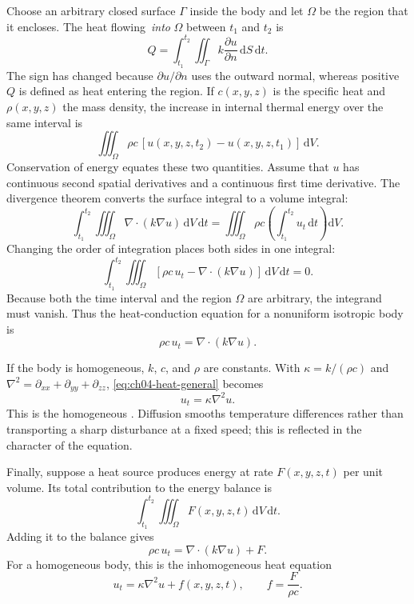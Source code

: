 Choose an arbitrary closed surface $\Gamma$ inside the body and let $\Omega$ be the region that it encloses. The heat flowing \,\emph{into} $\Omega$ between $t_1$ and $t_2$ is
\begin{equation}
Q=\int_{t_1}^{t_2}\iint_\Gamma k\frac{\partial u}{\partial n}\,\mathrm{d}S\,\mathrm{d}t.
\end{equation}
The sign has changed because $\partial u/\partial n$ uses the outward normal, whereas positive $Q$ is defined as heat entering the region. If $c(x,y,z)$ is the specific heat and $\rho(x,y,z)$ the mass density, the increase in internal thermal energy over the same interval is
\begin{equation}
\iiint_\Omega \rho c\,[u(x,y,z,t_2)-u(x,y,z,t_1)]\,\mathrm{d}V.
\end{equation}
Conservation of energy equates these two quantities. Assume that $u$ has continuous second spatial derivatives and a continuous first time derivative. The divergence theorem converts the surface integral to a volume integral:
\begin{equation}
\int_{t_1}^{t_2}\iiint_\Omega \nabla\cdot(k\nabla u)\,\mathrm{d}V\,\mathrm{d}t
=\iiint_\Omega \rho c\left(\int_{t_1}^{t_2}u_t\,\mathrm{d}t\right)\mathrm{d}V.
\end{equation}
Changing the order of integration places both sides in one integral:
\begin{equation}
\int_{t_1}^{t_2}\iiint_\Omega
\left[\rho c\,u_t-\nabla\cdot(k\nabla u)\right]\,\mathrm{d}V\,\mathrm{d}t=0.
\end{equation}
Because both the time interval and the region $\Omega$ are arbitrary, the integrand must vanish. Thus the heat-conduction equation for a nonuniform isotropic body is
\begin{equation}
\rho c\,u_t=\nabla\cdot(k\nabla u).
\label{eq:ch04-heat-general}
\end{equation}

If the body is homogeneous, $k$, $c$, and $\rho$ are constants. With $\kappa=k/(\rho c)$ and $\nabla^2=\partial_{xx}+\partial_{yy}+\partial_{zz}$, \eqref{eq:ch04-heat-general} becomes
\begin{equation}
u_t=\kappa\nabla^2u.
\label{eq:ch04-heat}
\end{equation}
This is the homogeneous . Diffusion smooths temperature differences rather than transporting a sharp disturbance at a fixed speed; this is reflected in the  character of the equation.

Finally, suppose a heat source produces energy at rate $F(x,y,z,t)$ per unit volume. Its total contribution to the energy balance is
\begin{equation}
\int_{t_1}^{t_2}\iiint_\Omega F(x,y,z,t)\,\mathrm{d}V\,\mathrm{d}t.
\end{equation}
Adding it to the balance gives
\begin{equation}
\rho c\,u_t=\nabla\cdot(k\nabla u)+F.
\end{equation}
For a homogeneous body, this is the inhomogeneous heat equation
\begin{equation}
u_t=\kappa\nabla^2u+f(x,y,z,t),
\qquad f=\frac{F}{\rho c}.
\end{equation}


